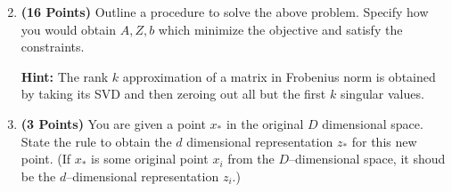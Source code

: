 \documentclass[a4paper]{article}
\theoremstyle{definition}
\begin{document}
\begin{enumerate}
\setcounter{enumi}{1}
\item \textbf{(16 Points)}
Outline a procedure to solve the above problem. Specify how you
would obtain $A, Z, b$ which minimize the objective and satisfy the constraints.

\textbf{Hint: }The rank $k$ approximation of a matrix in Frobenius norm is obtained by
taking its SVD and then zeroing out all but the first $k$ singular values.

\item \textbf{(3 Points)}
You are given a point $x_*$ in the original $D$ dimensional space.
State the rule to obtain the $d$ dimensional
representation $z_*$ for this new point.
(If $x_*$ is some original point $x_i$ from the $D$--dimensional space, it shoud be the
$d$--dimensional representation $z_i$.)


\end{enumerate}
\end{document}
